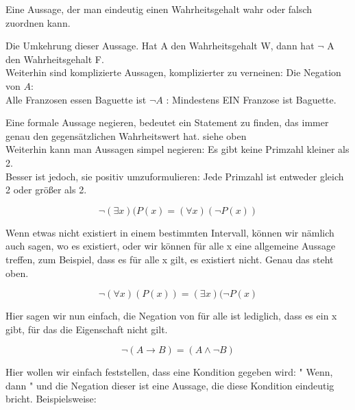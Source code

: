 \documentclass[headsepline,12pt,a4paper]{scrartcl}
\makeatletter
\def\myItem{%
   \@ifnextchar[ \@myItem{\@noitemargtrue\@myItem[\@itemlabel]}}
\def\@myItem[#1]{\item[#1]\mbox{}\\}
\makeatother
\begin{document}
\begin{itemize}


\myItem[Aussage] 

Eine Aussage, der man eindeutig einen Wahrheitsgehalt wahr oder falsch zuordnen kann. \\

\myItem[Negation]  

Die Umkehrung dieser Aussage. Hat A den Wahrheitsgehalt W, dann hat $\neg$ A den Wahrheitsgehalt F. \\ 

Weiterhin sind komplizierte Aussagen, komplizierter zu verneinen: Die Negation von $A$: \\
 Alle Franzosen essen Baguette ist $\neg A$ : Mindestens EIN Franzose ist Baguette. 

\myItem[Aussagen negieren]  

 Eine formale Aussage negieren, bedeutet ein Statement zu finden, das immer genau den gegensätzlichen Wahrheitswert hat. siehe oben\\
 Weiterhin kann man Aussagen simpel negieren: Es gibt keine Primzahl kleiner als 2. \\
 Besser ist jedoch, sie positiv umzuformulieren: Jede Primzahl ist entweder gleich 2 oder größer als 2. \\

\myItem[Negationsregeln]  

$$ \neg(\exists x )(P(x) = (\forall x) (\neg P (x)) $$ 

Wenn etwas nicht existiert in einem bestimmten Intervall, können wir nämlich auch sagen, wo es existiert, oder wir können für alle x eine allgemeine Aussage treffen, zum Beispiel, dass es für alle x gilt, es existiert nicht. Genau das steht oben.

$$ \neg  (\forall x) ( P (x)) = (\exists x )(\neg P(x)$$ 

Hier sagen wir nun einfach, die Negation von für alle ist lediglich, dass es ein x gibt, für das die Eigenschaft nicht gilt.

$$ \neg ( A \rightarrow B ) = ( A \wedge \neg B ) $$ 

Hier wollen wir einfach feststellen, dass eine Kondition gegeben wird: " Wenn, dann " und die Negation dieser ist eine Aussage, die diese Kondition eindeutig bricht. Beispielsweise: \\


\end{itemize}
\end{document}
